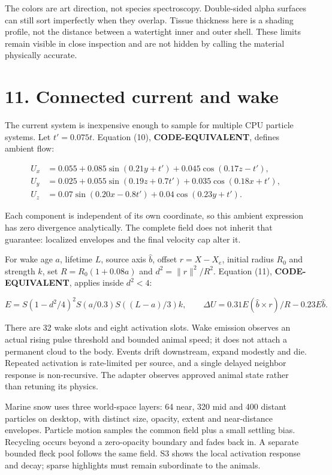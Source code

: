 \documentclass[
  english,
  11pt,
]{article}
\begin{document}
The colors are art direction, not species spectroscopy. Double-sided
alpha surfaces can still sort imperfectly when they overlap. Tissue
thickness here is a shading profile, not the distance between a
watertight inner and outer shell. These limits remain visible in close
inspection and are not hidden by calling the material physically
accurate.

\section{11. Connected current and
wake}\label{connected-current-and-wake}

The current system is inexpensive enough to sample for multiple CPU
particle systems. Let \(t'=0.075t\). Equation (10),
\textbf{CODE-EQUIVALENT}, defines ambient flow:

\[
\begin{aligned}
U_x&=0.055+0.085\sin(0.21y+t')+0.045\cos(0.17z-t'),\\
U_y&=0.025+0.055\sin(0.19z+0.7t')+0.035\cos(0.18x+t'),\\
U_z&=0.07\sin(0.20x-0.8t')+0.04\cos(0.23y+t').
\end{aligned}
\]

Each component is independent of its own coordinate, so this ambient
expression has zero divergence analytically. The complete field does not
inherit that guarantee: localized envelopes and the final velocity cap
alter it.

For wake age \(a\), lifetime \(L\), source axis \(\hat b\), offset
\(r=X-X_e\), initial radius \(R_0\) and strength \(k\), set
\(R=R_0(1+0.08a)\) and \(d^2=\|r\|^2/R^2\). Equation (11),
\textbf{CODE-EQUIVALENT}, applies inside \(d^2<4\):

\[
E=S(1-d^2/4)^2S(a/0.3)S((L-a)/3)k,
\qquad \Delta U=0.31E(\hat b\times r)/R-0.23E\hat b.
\]

There are 32 wake slots and eight activation slots. Wake emission
observes an actual rising pulse threshold and bounded animal speed; it
does not attach a permanent cloud to the body. Events drift downstream,
expand modestly and die. Repeated activation is rate-limited per source,
and a single delayed neighbor response is non-recursive. The adapter
observes approved animal state rather than retuning its physics.

Marine snow uses three world-space layers: 64 near, 320 mid and 400
distant particles on desktop, with distinct size, opacity, extent and
near-distance envelopes. Particle motion samples the common field plus a
small settling bias. Recycling occurs beyond a zero-opacity boundary and
fades back in. A separate bounded fleck pool follows the same field. S3
shows the local activation response and decay; sparse highlights must
remain subordinate to the animals.
\end{document}
